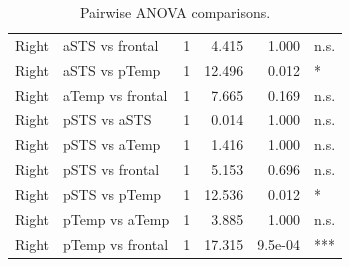 \begin{table}[h]
\begin{tabular}{llrrrl}
 Right        & aSTS vs frontal  &    1 &    4.415 &     1.000 & n.s.   \\
 Right        & aSTS vs pTemp    &    1 &   12.496 &     0.012 & *      \\
 Right        & aTemp vs frontal &    1 &    7.665 &     0.169 & n.s.   \\
 Right        & pSTS vs aSTS     &    1 &    0.014 &     1.000 & n.s.   \\
 Right        & pSTS vs aTemp    &    1 &    1.416 &     1.000 & n.s.   \\
 Right        & pSTS vs frontal  &    1 &    5.153 &     0.696 & n.s.   \\
 Right        & pSTS vs pTemp    &    1 &   12.536 &     0.012 & *      \\
 Right        & pTemp vs aTemp   &    1 &    3.885 &     1.000 & n.s.   \\
 Right        & pTemp vs frontal &    1 &   17.315 &   9.5e-04 & ***    \\
\bottomrule
\end{tabular}
\caption{Pairwise ANOVA comparisons.}
\end{table}